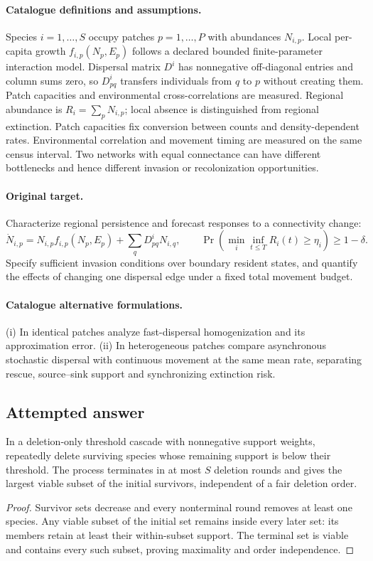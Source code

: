 \documentclass[11pt]{article}
\begin{document}
\paragraph{Catalogue definitions and assumptions.}
Species $i=1,\ldots,S$ occupy patches $p=1,\ldots,P$ with abundances $N_{i,p}$. Local per-capita growth $f_{i,p}(N_p,E_p)$ follows a declared bounded finite-parameter interaction model. Dispersal matrix $D^i$ has nonnegative off-diagonal entries and column sums zero, so $D^i_{pq}$ transfers individuals from $q$ to $p$ without creating them. Patch capacities and environmental cross-correlations are measured. Regional abundance is $R_i=\sum_pN_{i,p}$; local absence is distinguished from regional extinction. Patch capacities fix conversion between counts and density-dependent rates. Environmental correlation and movement timing are measured on the same census interval. Two networks with equal connectance can have different bottlenecks and hence different invasion or recolonization opportunities.
\paragraph{Original target.}
Characterize regional persistence and forecast responses to a connectivity change:
\[
 \dot N_{i,p}=N_{i,p}f_{i,p}(N_p,E_p)+\sum_qD^i_{pq}N_{i,q},
 \qquad
 \Pr(\min_i\inf_{t\le T}R_i(t)\ge\eta_i)\ge1-\delta.
\]
Specify sufficient invasion conditions over boundary resident states, and quantify the effects of changing one dispersal edge under a fixed total movement budget.
\paragraph{Catalogue alternative formulations.}
(i) In identical patches analyze fast-dispersal homogenization and its approximation error. (ii) In heterogeneous patches compare asynchronous stochastic dispersal with continuous movement at the same mean rate, separating rescue, source--sink support and synchronizing extinction risk.
\subsection{Attempted answer}
\begin{proposition}
In a deletion-only threshold cascade with nonnegative support weights, repeatedly delete surviving species whose remaining support is below their threshold. The process terminates in at most $S$ deletion rounds and gives the largest viable subset of the initial survivors, independent of a fair deletion order.
\end{proposition}
\begin{proof}
Survivor sets decrease and every nonterminal round removes at least one species. Any viable subset of the initial set remains inside every later set: its members retain at least their within-subset support. The terminal set is viable and contains every such subset, proving maximality and order independence.
\end{proof}
\end{document}
